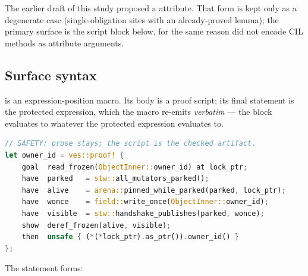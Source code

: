 The earlier draft of this study proposed a
 attribute. That form is kept
only as a degenerate case (single-obligation sites with an
already-proved lemma); the primary surface is the script block below,
for the same reason  did not encode CIL methods as
attribute arguments.

\subsection{Surface syntax}
\label{sec:dsl-syntax}

 is an expression-position macro. Its body is a
proof script; its final statement is the protected expression, which
the macro re-emits \emph{verbatim} --- the block evaluates to whatever
the protected expression evaluates to.

\begin{lstlisting}[language=Rust,
  morekeywords={goal,have,show,then,trust,note,checked,infer}]
// SAFETY: prose stays; the script is the checked artifact.
let owner_id = ves::proof! {
    goal  read_frozen(ObjectInner::owner_id) at lock_ptr;
    have  parked   = stw::all_mutators_parked();
    have  alive    = arena::pinned_while_parked(parked, lock_ptr);
    have  wonce    = field::write_once(ObjectInner::owner_id);
    have  visible  = stw::handshake_publishes(parked, wonce);
    show  deref_frozen(alive, visible);
    then  unsafe { (*(*lock_ptr).as_ptr()).owner_id() }
};
\end{lstlisting}

The statement forms:

